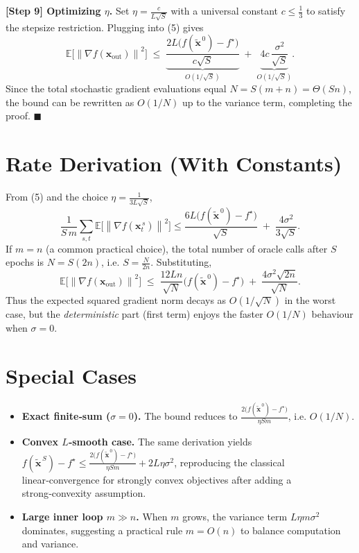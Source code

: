\documentclass{article}
\newcommand{\EE}{\mathbb{E}}
\newcommand{\norm}[1]{\left\|#1\right\|}
\newcommand{\grad}{\nabla}
\begin{document}
\noindent\textbf{[Step 9] Optimizing $\eta$.}
Set $\eta=\frac{c}{L\sqrt{S}}$ with a universal constant $c\le\frac{1}{3}$
to satisfy the stepsize restriction.
Plugging into (5) gives
\[
\EE\!\big[\norm{\grad f(\mathbf{x}_{\mathrm{out}})}^{2}\big]
\;\le\;
\underbrace{\frac{2L\big(f(\tilde{\mathbf{x}}^{\,0})-f^{\star}\big)}{c\sqrt{S}}}_{O(1/\sqrt{S})}
\;+\;
\underbrace{4c\,\frac{\sigma^{2}}{\sqrt{S}}}_{O(1/\sqrt{S})}.
\]
Since the total stochastic gradient evaluations equal $N=S(m+n)=\Theta(Sn)$,
the bound can be rewritten as $O(1/N)$ up to the variance term, completing the
proof. \hfill $\blacksquare$

\section*{Rate Derivation (With Constants)}
From (5) and the choice $\eta=\frac{1}{3L\sqrt{S}}$,
\[
\frac{1}{S\,m}\sum_{s,t}\EE\!\big[\norm{\grad f(\mathbf{x}_{t}^{\,s})}^{2}\big]
\le
\frac{6L\big(f(\tilde{\mathbf{x}}^{\,0})-f^{\star}\big)}{\sqrt{S}}
\;+\;
\frac{4\sigma^{2}}{3\sqrt{S}}.
\]
If $m=n$ (a common practical choice), the total number of oracle calls after $S$
epochs is $N=S(2n)$, i.e. $S=\frac{N}{2n}$.  Substituting,
\[
\EE\!\big[\norm{\grad f(\mathbf{x}_{\mathrm{out}})}^{2}\big]
\;\le\;
\frac{12L n}{\sqrt{N}}\big(f(\tilde{\mathbf{x}}^{\,0})-f^{\star}\big)
\;+\;
\frac{4\sigma^{2}\sqrt{2n}}{\sqrt{N}}.
\]
Thus the expected squared gradient norm decays as $O(1/\sqrt{N})$ in the
worst case, but the \emph{deterministic} part (first term) enjoys the faster
$O(1/N)$ behaviour when $\sigma=0$.

\section*{Special Cases}
\begin{itemize}[leftmargin=*]
\item \textbf{Exact finite‑sum ($\sigma=0$).}
      The bound reduces to
      $\displaystyle \frac{2\big(f(\tilde{\mathbf{x}}^{\,0})-f^{\star}\big)}{\eta S m}$,
      i.e. $O(1/N)$.
\item \textbf{Convex $L$‑smooth case.}
      The same derivation yields
      $\displaystyle f(\tilde{\mathbf{x}}^{\,S})-f^{\star}
        \le \frac{2\big(f(\tilde{\mathbf{x}}^{\,0})-f^{\star}\big)}{\eta S m}
        +2L\eta\sigma^{2}$,
      reproducing the classical linear‑convergence for strongly convex
      objectives after adding a strong‑convexity assumption.
\item \textbf{Large inner loop $m\gg n$.}
      When $m$ grows, the variance term $L\eta m\sigma^{2}$ dominates,
      suggesting a practical rule $m=O(n)$ to balance computation and variance.
\end{itemize}
\end{document}
